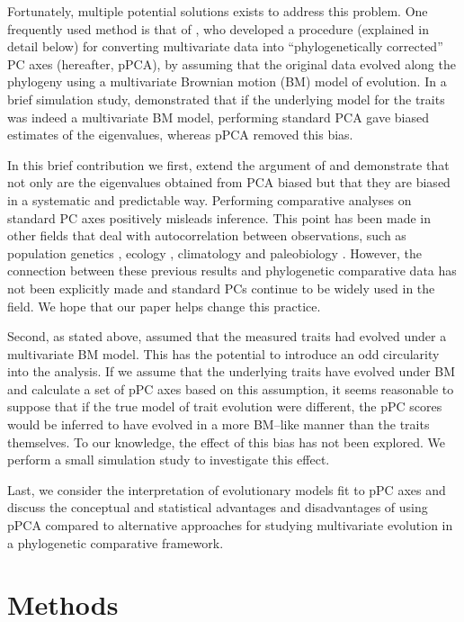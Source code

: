 \documentclass[a4paper,12pt]{article}
\begin{document}
Fortunately, multiple potential solutions exists to address this problem.  One frequently used method is that of \citet{Revell2008}, who developed a procedure (explained in detail below) for converting multivariate data into ``phylogenetically corrected'' PC axes (hereafter, pPCA), by assuming that the original data evolved along the phylogeny using a multivariate Brownian motion (BM) model of evolution. In a brief simulation study, \citet{Revell2008} demonstrated that if the underlying model for the traits was indeed a multivariate BM model, performing standard PCA gave biased estimates of the eigenvalues, whereas pPCA removed this bias.

In this brief contribution we first, extend the argument of \citet{Revell2008} and demonstrate that not only are the eigenvalues obtained from PCA biased but that they are biased in a systematic and predictable way. Performing comparative analyses on standard PC axes positively misleads inference. This point has been made in other fields that deal with autocorrelation between observations, such as population genetics \citep{Novembre}, ecology \citep{Podani2002}, climatology \citep{Richman1986} and paleobiology \citep{Bookstein2012}. However, the connection between these previous results and phylogenetic comparative data has not been explicitly made and standard PCs continue to be widely used in the field. We hope that our paper helps change this practice.

Second, as stated above, \citet{Revell2008} assumed that the measured traits had evolved under a multivariate BM model. This has the potential to introduce an odd circularity into the analysis. If we assume that the underlying traits have evolved under BM and calculate a set of pPC axes based on this assumption, it seems reasonable to suppose that if the true model of trait evolution were different, the pPC scores would be inferred to have evolved in a more BM--like manner than the traits themselves. To our knowledge, the effect of this bias has not been explored. We perform a small simulation study to investigate this effect.

Last, we consider the interpretation of evolutionary models fit to pPC axes and discuss the conceptual and statistical advantages and disadvantages of using pPCA compared to alternative approaches for studying multivariate evolution in a phylogenetic comparative framework.

\section{Methods}
\end{document}
